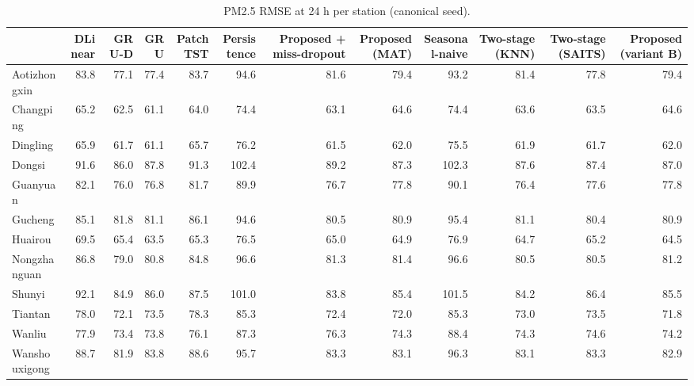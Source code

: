 \begin{table}
\caption{PM2.5 RMSE at 24 h per station (canonical seed).}
\label{tab:station_rmse}
\begin{tabular}{lrrrrrrrrrrr}
\toprule
 & DLinear & GRU-D & GRU & PatchTST & Persistence & Proposed + miss-dropout & Proposed (MAT) & Seasonal-naive & Two-stage (KNN) & Two-stage (SAITS) & Proposed (variant B) \\
\midrule
Aotizhongxin & 83.8 & 77.1 & 77.4 & 83.7 & 94.6 & 81.6 & 79.4 & 93.2 & 81.4 & 77.8 & 79.4 \\
Changping & 65.2 & 62.5 & 61.1 & 64.0 & 74.4 & 63.1 & 64.6 & 74.4 & 63.6 & 63.5 & 64.6 \\
Dingling & 65.9 & 61.7 & 61.1 & 65.7 & 76.2 & 61.5 & 62.0 & 75.5 & 61.9 & 61.7 & 62.0 \\
Dongsi & 91.6 & 86.0 & 87.8 & 91.3 & 102.4 & 89.2 & 87.3 & 102.3 & 87.6 & 87.4 & 87.0 \\
Guanyuan & 82.1 & 76.0 & 76.8 & 81.7 & 89.9 & 76.7 & 77.8 & 90.1 & 76.4 & 77.6 & 77.8 \\
Gucheng & 85.1 & 81.8 & 81.1 & 86.1 & 94.6 & 80.5 & 80.9 & 95.4 & 81.1 & 80.4 & 80.9 \\
Huairou & 69.5 & 65.4 & 63.5 & 65.3 & 76.5 & 65.0 & 64.9 & 76.9 & 64.7 & 65.2 & 64.5 \\
Nongzhanguan & 86.8 & 79.0 & 80.8 & 84.8 & 96.6 & 81.3 & 81.4 & 96.6 & 80.5 & 80.5 & 81.2 \\
Shunyi & 92.1 & 84.9 & 86.0 & 87.5 & 101.0 & 83.8 & 85.4 & 101.5 & 84.2 & 86.4 & 85.5 \\
Tiantan & 78.0 & 72.1 & 73.5 & 78.3 & 85.3 & 72.4 & 72.0 & 85.3 & 73.0 & 73.5 & 71.8 \\
Wanliu & 77.9 & 73.4 & 73.8 & 76.1 & 87.3 & 76.3 & 74.3 & 88.4 & 74.3 & 74.6 & 74.2 \\
Wanshouxigong & 88.7 & 81.9 & 83.8 & 88.6 & 95.7 & 83.3 & 83.1 & 96.3 & 83.1 & 83.3 & 82.9 \\
\bottomrule
\end{tabular}
\end{table}
